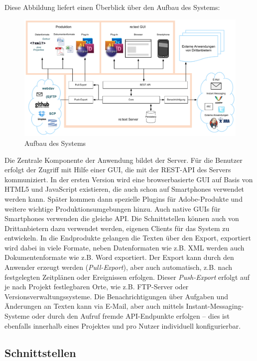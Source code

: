 Diese Abbildung liefert einen Überblick über den Aufbau des Systems:

\begin{figure}[htb]
\begin{center}
\includegraphics[width=\textwidth]{media/System.pdf}
\caption{Aufbau des Systems}
\label{chart:1}
\end{center}
\end{figure}

Die Zentrale Komponente der Anwendung bildet der Server. Für die Benutzer erfolgt der Zugriff mit Hilfe einer GUI, die mit der REST-API des Servers kommuniziert. In der ersten Version wird eine browserbasierte GUI auf Basis von HTML5 und JavaScript existieren, die auch schon auf Smartphones verwendet werden kann. Später kommen dann spezielle Plugins für Adobe-Produkte und weitere wichtige Produktionsumgebungen hinzu. Auch native GUIs für Smartphones verwenden die gleiche API. Die Schnittstellen können auch von Drittanbietern dazu verwendet werden, eigenen Clients für das System zu entwickeln. In die Endprodukte gelangen die Texten über den Export, exportiert wird dabei in viele Formate, neben Datenformaten wie z.B. XML werden auch Dokumentenformate wie z.B. Word exportiert. Der Export kann durch den Anwender erzeugt werden (\emph{Pull-Export}), aber auch automatisch, z.B. nach festgelegten Zeitplänen oder Ereignissen erfolgen. Dieser \emph{Push-Export} erfolgt auf je nach Projekt festlegbaren Orte, wie z.B. FTP-Server oder Versionsverwaltungssysteme. Die Benachrichtigungen über Aufgaben und Änderungen an Texten kann via E-Mail, aber auch mittels Instant-Messaging-Systeme oder durch den Aufruf fremde API-Endpunkte erfolgen – dies ist ebenfalls innerhalb eines Projektes und pro Nutzer individuell konfigurierbar.

\subsection{Schnittstellen}

